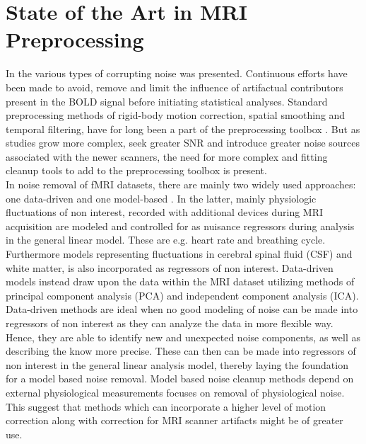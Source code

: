 \section{State of the Art in MRI Preprocessing} \label{art}

In  the various types of corrupting noise was presented. Continuous efforts have been made to avoid, remove and limit the influence of artifactual contributors present in the BOLD signal before initiating statistical analyses. Standard preprocessing methods of rigid-body motion correction, spatial smoothing and temporal filtering, have for long been a part of the preprocessing toolbox \cite{Poldrack2011,Salimi-Khorshidi2014}. But as studies grow more complex, seek greater SNR and introduce greater noise sources associated with the newer scanners, the need for more complex and fitting cleanup tools to add to the preprocessing toolbox is present. \cite{Wood2012,Liu2006} \\
In noise removal of fMRI datasets, there are mainly two widely used approaches: one data-driven and one model-based \cite{Salimi-Khorshidi2014,Iraji2016}. In the latter, mainly physiologic fluctuations of non interest, recorded with additional devices during MRI acquisition are modeled and controlled for as nuisance regressors during analysis in the general linear model. These are e.g. heart rate and breathing cycle. Furthermore models representing fluctuations in cerebral spinal fluid (CSF) and white matter, is also incorporated as regressors of non interest. \cite{Salimi-Khorshidi2014,Iraji2016,Monti2011} Data-driven models instead draw upon the data within the MRI dataset utilizing methods of principal component analysis (PCA) and independent component analysis (ICA). Data-driven methods are ideal when no good modeling of noise can be made into regressors of non interest as they can analyze the data in more flexible way. Hence, they are able to identify new and unexpected noise components, as well as describing the know more precise. These can then can be made into regressors of non interest in the general linear analysis model, thereby laying the foundation for a model based noise removal. \cite{Iraji2016} Model based noise cleanup methods depend on external physiological measurements focuses on removal of physiological noise. This suggest that methods which can incorporate a higher level of motion correction along with correction for MRI scanner artifacts might be of greater use. \\
%
